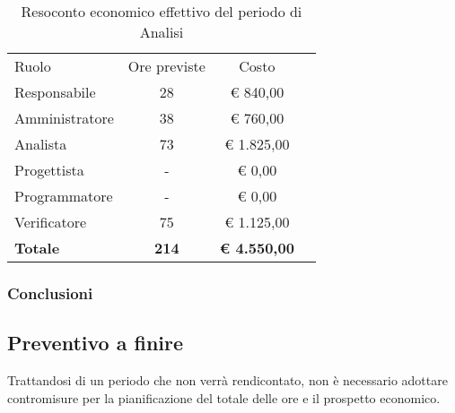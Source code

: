 \documentclass[../piano-di-progetto.tex]{subfiles}
\begin{document}
  \begin{table}[H]
    \centering
    \begin{tabular}{lccc}
        Ruolo           & Ore previste & Costo               \\
        Responsabile    & 28           & € 840,00            \\
        Amministratore  & 38           & € 760,00            \\
        Analista        & 73           & € 1.825,00          \\
        Progettista     & -            & € 0,00              \\
        Programmatore   & -            & € 0,00              \\
        Verificatore    & 75           & € 1.125,00          \\
        \textbf{Totale} & \textbf{214} & \textbf{€ 4.550,00}
    \end{tabular}
    \caption{Resoconto economico effettivo del periodo di Analisi}
  \end{table}


\subsubsection{Conclusioni}

\subsection{Preventivo a finire}
Trattandosi di un periodo che non verrà rendicontato, non è necessario adottare contromisure per la pianificazione del totale delle ore e il prospetto economico.
\end{document}
